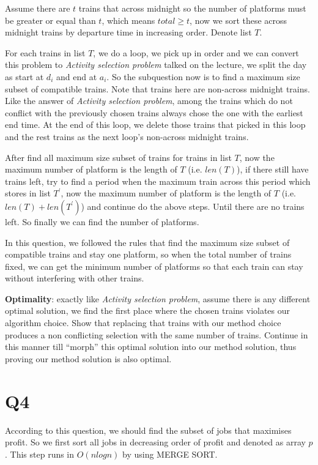 \documentclass[a4paper]{article}
\begin{document}
	Assume there are $t$ trains that across midnight so the number of platforms must be greater or equal than $t$, which means $total \geq t$, now we sort these across midnight trains by departure time in increasing order. Denote list $T$.
	
	For each trains in list $T$, we do a loop, we pick up in order and we can convert this problem to \textit{Activity selection problem} talked on the lecture, we split the day as start at $d_i$ and end at $a_i$. So the subquestion now is to find a maximum size subset of compatible trains. Note that trains here are non-across midnight trains. Like the answer of \textit{Activity selection problem}, among the trains which do not conflict with the previously chosen trains always chose the one with the earliest end time. At the end of this loop, we delete those trains that picked in this loop and the rest trains as the next loop's non-across midnight trains.
	
	After find all maximum size subset of trains for trains in list $T$, now the maximum number of platform is the length of $T$ (i.e. $len(T)$), if there still have trains left, try to find a period when the maximum train across this period which stores in list $T^{'}$, now the maximum number of platform is the length of $T$ (i.e. $len(T)+len(T^{'})$) and continue do the above steps. Until there are no trains left. So finally we can find the number of platforms.
	
	In this question, we followed the rules that find the maximum size subset of compatible trains and stay one platform, so when the total number of trains fixed, we can get the minimum number of platforms so that each train can stay without interfering with other trains.
	  
	\textbf{Optimality}: exactly like \textit{Activity selection problem}, assume there is any different optimal solution, we find the first place where the chosen trains violates our algorithm choice. Show that replacing that trains with our method choice produces a non conflicting selection with the same number of trains. Continue in this manner till  “morph” this optimal solution into our method solution, thus proving our method solution is also optimal.
	
	\section*{Q4}
	According to this question, we should find the subset of jobs that maximises profit. So we first sort all jobs in decreasing order of profit and denoted as array $p$. This step runs in $O(nlog n)$ by using MERGE SORT.
	
\end{document}
